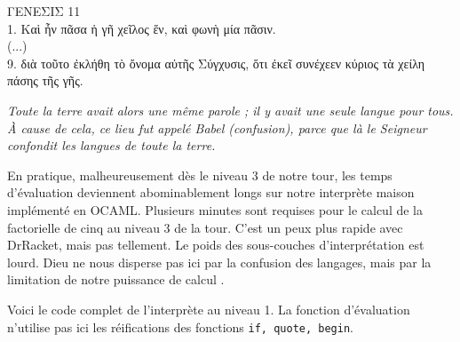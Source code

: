 \vspace{0.5cm}

ΓΕΝΕΣΙΣ     11 \\
  1. Καὶ ἦν πᾶσα ἡ γῆ χεῖλος ἕν, καὶ φωνὴ μία πᾶσιν. \\
   (...) \\ 
  9. διὰ τοῦτο ἐκλήθη τὸ ὄνομα αὐτῆς Σύγχυσις, ὅτι ἐκεῖ συνέχεεν κύριος τὰ χείλη πάσης τῆς γῆς.

\textit{\noindent
  Toute la terre avait alors une même parole ; il y avait une seule langue pour tous. \\ 
  À cause de cela, ce lieu fut appelé Babel (confusion), parce que là le Seigneur confondit les langues de toute la terre.
}

\vspace{0.3cm}
En pratique, malheureusement dès le niveau 3 de notre tour, les temps d'évaluation deviennent abominablement longs sur 
notre interprète  maison implémenté en OCAML.
Plusieurs minutes sont requises pour le calcul de la factorielle de cinq au niveau 3 de la tour.
C'est un peux plus rapide avec DrRacket, mais pas tellement. Le poids des sous-couches d'interprétation est lourd.
Dieu ne nous disperse pas ici par la confusion des langages, mais par la limitation de notre puissance de calcul \Laughey .


Voici le code complet de l'interprète au niveau 1. La fonction d'évaluation n'utilise pas ici
les réifications des fonctions \verb+if, quote, begin+.

